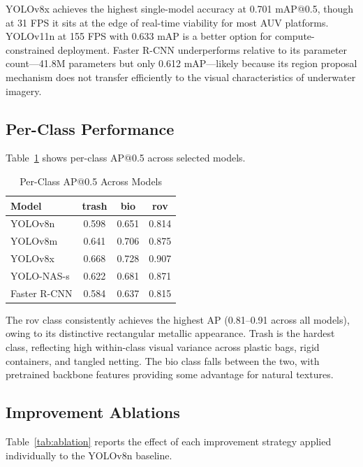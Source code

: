 \documentclass[conference]{IEEEtran}
\begin{document}
YOLOv8x achieves the highest single-model accuracy at 0.701 mAP@0.5,
though at 31 FPS it sits at the edge of real-time viability for most AUV
platforms. YOLOv11n at 155 FPS with 0.633 mAP is a better option for
compute-constrained deployment. Faster R-CNN underperforms relative to
its parameter count---41.8M parameters but only 0.612 mAP---likely
because its region proposal mechanism does not transfer efficiently to
the visual characteristics of underwater imagery.

\subsection{Per-Class Performance}

Table~\ref{tab:perclass} shows per-class AP@0.5 across selected models.

\begin{table}[htbp]
\caption{Per-Class AP@0.5 Across Models}
\label{tab:perclass}
\begin{center}
\begin{tabular}{lccc}
\toprule
\textbf{Model} & \textbf{trash} & \textbf{bio} & \textbf{rov} \\
\midrule
YOLOv8n      & 0.598 & 0.651 & 0.814 \\
YOLOv8m      & 0.641 & 0.706 & 0.875 \\
YOLOv8x      & 0.668 & 0.728 & 0.907 \\
YOLO-NAS-s   & 0.622 & 0.681 & 0.871 \\
Faster R-CNN & 0.584 & 0.637 & 0.815 \\
\bottomrule
\end{tabular}
\end{center}
\end{table}

The rov class consistently achieves the highest AP (0.81--0.91 across all
models), owing to its distinctive rectangular metallic appearance. Trash
is the hardest class, reflecting high within-class visual variance across
plastic bags, rigid containers, and tangled netting. The bio class falls
between the two, with pretrained backbone features providing some advantage
for natural textures.

\subsection{Improvement Ablations}

Table~\ref{tab:ablation} reports the effect of each improvement strategy
applied individually to the YOLOv8n baseline.
\end{document}
